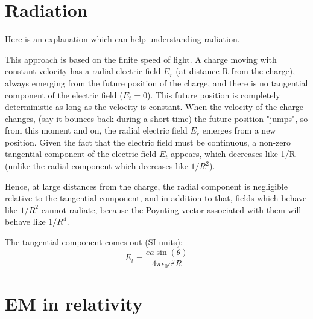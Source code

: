 \section{Radiation} 
Here is an explanation which can help understanding radiation.

This approach is based on the finite speed of light. A charge moving with 
constant velocity has a radial electric field $E_{r}$ (at distance R from 
the charge), always emerging from the future position of the charge, and 
there is no tangential component of the electric field ($E_{t}=0$). This 
future position is completely deterministic as long as the velocity is 
constant. When the velocity of the charge changes, (say it bounces back 
during a short time) the future position "jumps", so from this moment 
and on, the radial electric field $E_{r}$ emerges from a new position. 
Given the fact that the electric field must be continuous, a non-zero 
tangential component of the electric field $E_{t}$ appears, which 
decreases like 1/R (unlike the radial component which decreases like 
$\displaystyle 1/R^{2}$).

Hence, at large distances from the charge, the radial component is negligible relative to the tangential component, and in addition to that, fields which behave like $\displaystyle 1/R^{2}$ cannot radiate, because the Poynting vector associated with them will behave like $\displaystyle 1/R^{4}$.

The tangential component comes out (SI units):
\[
    E_t = \frac{ea\sin(\theta)}{4\pi\epsilon_0 c^2 R}
\]



\section{EM in relativity}


